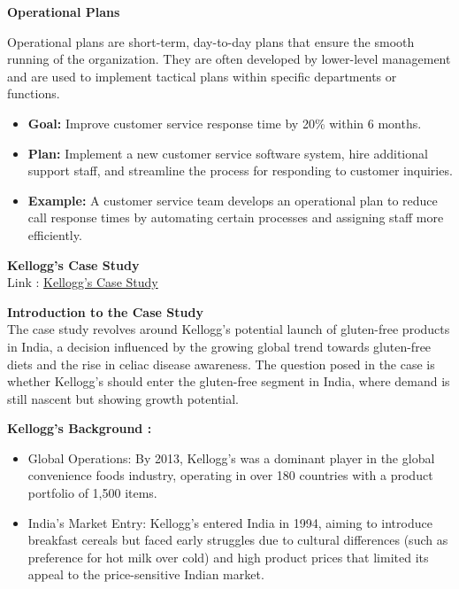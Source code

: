 \documentclass[10pt,a4paper]{book}
\begin{document}
\vspace{0.5cm}

\textbf{Operational Plans}

Operational plans are short-term, day-to-day plans that ensure the smooth running of the organization. They are often developed by lower-level management and are used to implement tactical plans within specific departments or functions.

\begin{itemize}
    \item \textbf{Goal:} Improve customer service response time by 20\% within 6 months.
    \item \textbf{Plan:} Implement a new customer service software system, hire additional support staff, and streamline the process for responding to customer inquiries.
    \item \textbf{Example:} A customer service team develops an operational plan to reduce call response times by automating certain processes and assigning staff more efficiently.
\end{itemize}

\vspace{0.5cm}


\clearpage


\textbf{Kellogg's Case Study} \\

\quad Link : \href{https://drive.google.com/file/d/1bPwYiuNA5Bm_KcE8Z8i7J4IoZhdQA7E3/view}{Kellogg's Case Study}

\vspace{0.5cm}

\textbf{Introduction to the Case Study} \\
The case study revolves around Kellogg's potential launch of gluten-free products in India, a decision influenced by the growing global trend towards gluten-free diets and the rise in celiac disease awareness. The question posed in the case is whether Kellogg's should enter the gluten-free segment in India, where demand is still nascent but showing growth potential.


\textbf{Kellogg's Background :}
\begin{itemize}
    \item Global Operations: By 2013, Kellogg's was a dominant player in the global convenience foods industry, operating in over 180 countries with a product portfolio of 1,500 items. 
    \item India's Market Entry: Kellogg's entered India in 1994, aiming to introduce breakfast cereals but faced early struggles due to cultural differences (such as preference for hot milk over cold) and high product prices that limited its appeal to the price-sensitive Indian market.
\end{itemize}
\end{document}
